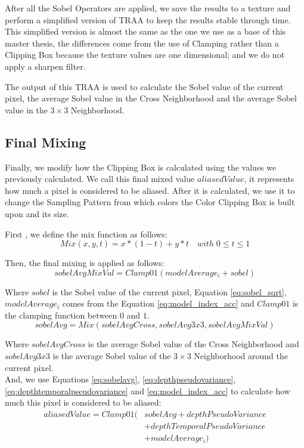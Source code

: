 \documentclass{cslthse-msc}
\begin{document}
After all the Sobel Operators are applied, we save the results to a texture and perform a simplified version of TRAA to keep the results stable through time. This simplified version is almost the same as the one we use as a base of this master thesis, the differences come from the use of Clamping rather than a Clipping Box because the texture values are one dimensional; and we do not apply a sharpen filter.

The output of this TRAA is used to calculate the Sobel value of the current pixel, the average Sobel value in the Cross Neighborhood and the average Sobel value in the $3\times 3$ Neighborhood.

\subsection{Final Mixing}
Finally, we  modify how the Clipping Box is calculated using the values we previously calculated. We call this final mixed value $aliasedValue$, it represents how much a pixel is considered to be aliased. After it is calculated, we use it to change the Sampling Pattern from which colors the Color Clipping Box is built upon and its  size.

First , we define the mix function as follows:
\begin{equation} \label{eq:mixfunction}
Mix(x,y,t)=x*(1-t)+y*t\quad with\; 0\leq t\leq 1
\end{equation} 

Then, the final mixing is applied as follows:
\begin{equation}\label{eq:sobelavgmixval}
sobelAvgMixVal=Clamp01(modelAverage_i+sobel) 
\end{equation}
 
Where $sobel$ is the Sobel value of the current pixel, Equation \ref{eq:sobel_sqrt}, $modelAverage_i$ comes from the Equation \ref{eq:model_index_acc} and $Clamp01$ is the clamping function between $0$ and $1$. \\

\begin{equation}\label{eq:sobelavg}
sobelAvg=Mix(sobelAvgCross, sobelAvg3x3, sobelAvgMixVal)
\end{equation}

Where $sobelAvgCross$ is the average Sobel value of the Cross Neighborhood and $sobelAvg3x3$ is the average Sobel value of the $3\times 3$ Neighborhood around the current pixel. \\ 

And, we use Equations \ref{eq:sobelavg}, \ref{eq:depthpseudovariance}, \ref{eq:depthtemporalpseudovariance} and \ref{eq:model_index_acc} to calculate how much this pixel is considered to be aliased:
\begin{equation}\label{eq:aliasedvalue}
\begin{split}
aliasedValue=Clamp01 (& sobelAvg + depthPseudoVariance \\
 & + depthTemporalPseudoVariance \\
 & + modelAverage_i)
\end{split}
\end{equation}
\end{document}
